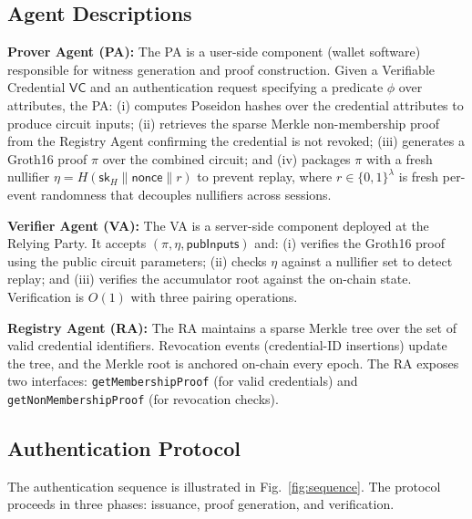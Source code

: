\documentclass[journal,12pt,onecolumn]{IEEEtran}
\begin{document}
\begin{figure}[t]
\begin{center}
\begin{tikzpicture}
\end{tikzpicture}
\end{center}
\end{figure}

\subsection{Agent Descriptions}

\textbf{Prover Agent (PA):} The PA is a user-side component (wallet
software) responsible for witness generation and proof construction.
Given a Verifiable Credential $\mathsf{VC}$ and an authentication
request specifying a predicate $\phi$ over attributes, the PA:
(i) computes Poseidon hashes \cite{grassi2021poseidon} over the
credential attributes to produce circuit inputs; (ii) retrieves the
sparse Merkle non-membership proof from the Registry Agent confirming
the credential is not revoked; (iii) generates a Groth16 proof $\pi$
over the combined circuit; and (iv) packages $\pi$ with a fresh
nullifier $\eta = H(\mathsf{sk}_H \| \mathsf{nonce} \| r)$ to prevent
replay, where $r \in \{0,1\}^\lambda$ is fresh per-event randomness
that decouples nullifiers across sessions.

\textbf{Verifier Agent (VA):} The VA is a server-side component deployed
at the Relying Party. It accepts $(\pi, \eta, \mathsf{pubInputs})$ and:
(i) verifies the Groth16 proof using the public circuit parameters;
(ii) checks $\eta$ against a nullifier set to detect replay; and (iii)
verifies the accumulator root against the on-chain state. Verification
is $O(1)$ with three pairing operations.

\textbf{Registry Agent (RA):} The RA maintains a sparse Merkle tree
\cite{khovratovich2023merkle} over the set of valid credential
identifiers. Revocation events (credential-ID insertions) update the
tree, and the Merkle root is anchored on-chain every epoch. The RA
exposes two interfaces: \texttt{getMembershipProof} (for valid
credentials) and \texttt{getNonMembershipProof} (for revocation checks).

\subsection{Authentication Protocol}

The authentication sequence is illustrated in Fig.~\ref{fig:sequence}.
The protocol proceeds in three phases: issuance, proof generation, and
verification.
\end{document}
